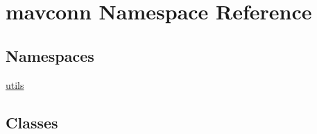 \hypertarget{namespacemavconn}{}\section{mavconn Namespace Reference}
\label{namespacemavconn}
\subsection*{Namespaces}
\begin{DoxyCompactItemize}
\item 
 \mbox{\hyperlink{namespacemavconn_1_1utils}{utils}}
\end{DoxyCompactItemize}
\subsection*{Classes}
